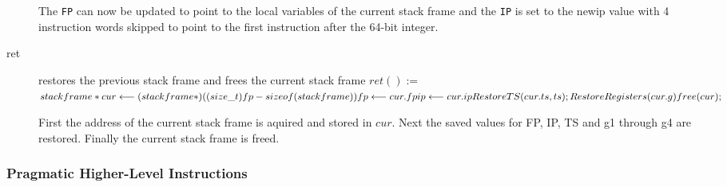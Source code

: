 \documentclass[english,a4paper]{article}
\begin{document}
\begin{description}
  The \verb|FP| can now be updated to point to the local variables of
  the current stack frame and the \verb|IP| is set to the newip value
  with 4 instruction words skipped to point to the first instruction
  after the 64-bit integer.
  
\item[ret] restores the previous stack frame and frees the current
  stack frame
  $ret() := $  \\
  $ stackframe *cur \longleftarrow (stackframe*)((size\_t)fp - sizeof(stackframe)) \\
  fp \longleftarrow cur.fp \\
  ip \longleftarrow cur.ip \\
  RestoreTS(cur.ts, ts);\\
  RestoreRegisters(cur.g) \\
  free(cur); \\$

  First the address of the current stack frame is aquired and stored
  in $cur$.
  Next the saved values for FP, IP, TS and g1 through g4 are restored.
  Finally the current stack frame is freed.
\end{description}


\subsubsection{Pragmatic Higher-Level Instructions}
\end{document}
